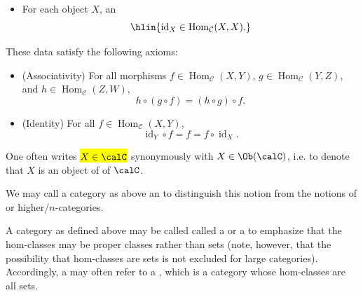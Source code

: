 \begin{definition}[Category]
\begin{itemize}
        denoted \hl{$(g,f) \mapsto g \circ f$}.
        \item For each object $X$, an 
        $$\hlin{\operatorname{id}_X \in \operatorname{Hom}_{\mathcal{C}}(X,X).}$$
    \end{itemize}
    These data satisfy the following axioms:
    \begin{itemize}
        \item (Associativity) For all morphisms $f \in \operatorname{Hom}_{\mathcal{C}}(X,Y)$, $g \in \operatorname{Hom}_{\mathcal{C}}(Y,Z)$, and $h \in \operatorname{Hom}_{\mathcal{C}}(Z,W)$, 
        $$
        h \circ (g \circ f) = (h \circ g) \circ f.
        $$
        \item (Identity) For all $f \in \operatorname{Hom}_{\mathcal{C}}(X,Y)$,
        $$
        \operatorname{id}_Y \circ f = f = f \circ \operatorname{id}_X.
        $$
    \end{itemize}
    One often writes \hl{$X \in \calC$} synonymously with $X \in \Ob(\calC)$, i.e. to denote that $X$ is an object of of $\calC$. 

    We may call a category as above an  to distinguish this notion from the notions of  or higher/$n$-categories.

    A category as defined above may be called called a  or a  to emphasize that the hom-classes may be proper classes rather than sets (note, however, that the possibility that hom-classes are sets is not excluded for large categories). Accordingly, a  may often refer to a , which is a category whose hom-classes are all sets.
\end{definition}

